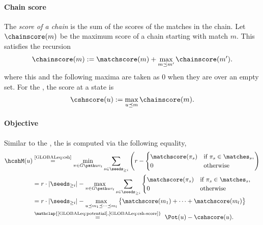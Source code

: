 \paragraph{Chain score}
The \emph{score of a chain} is the sum of the scores of the matches in the chain.
Let $\chainscore(m)$ be the maximum score of a chain starting with match $m$. This
satisfies the recursion
\begin{equation}
\chainscore(m) := \matchscore(m) + \max_{m\preceq m' } \chainscore(m').
\label{GLOBALeq:chainscore}
\end{equation}
where this and the following maxima are taken as $0$ when they are over an empty
set. For the \csh, the score at a state is
\begin{equation} \label{GLOBALeq:csh-score}
  \cshscore(u) := \max_{u\preceq m} \chainscore(m).
\end{equation}

\paragraph{Objective} Similar to the \sh, the \csh is computed via the
following equality,
\begin{align}
  \hcshM(u)
  &\stackrel{\text{\eqref{GLOBALeq:csh}}}= \min_{\pi \in G \path u{v_t}}  \sum_{s\in \seeds_{\geq i}} \left(
    r -
    \begin{cases}
    \matchscore(\pi_s) &\text{if $\pi_s \in \matches_s$}, \\
    0 &\text{otherwise}
    \end{cases}
  \right)\nonumber\\
  &= r\cdot |\seeds_{\geq i}| -
    \max_{\pi \in G \path u{v_t}}  \sum_{s\in \seeds_{\geq i}}
    \begin{cases}
    \matchscore(\pi_s) &\text{if $\pi_s \in \matches_s$}, \\
    0 &\text{otherwise}
    \end{cases}
  \nonumber\\
  &= r\cdot |\seeds_{\geq i}| -
    \max_{u\preceq m_1\preceq \dots \preceq m_l}
      \big\{\matchscore(m_1) + \dots + \matchscore(m_l)\big\} \nonumber\\
  &\stackrel{\mathclap{\text{\eqref{GLOBALeq:potential},\eqref{GLOBALeq:csh-score}}}}=\ \Pot(u) - \cshscore(u).
  \label{GLOBALeq:csh-computation}
\end{align}



